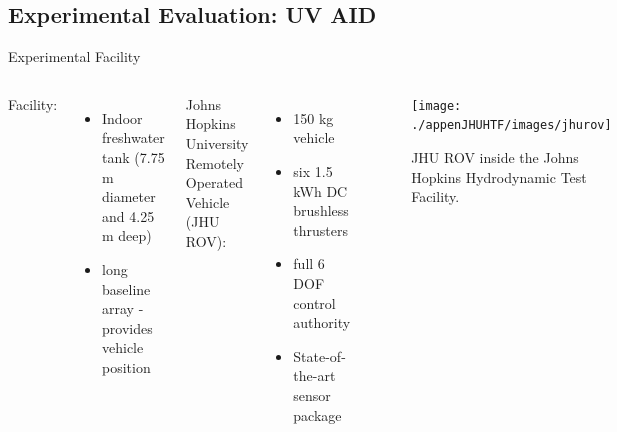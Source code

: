 %


\subsection{Experimental Evaluation: UV AID}

\begin{frame}{Experimental Facility}

  \begin{columns}

    Facility:
    \begin{itemize}
    \item Indoor freshwater tank (7.75 m diameter and 4.25 m deep)
    \item long baseline array - provides vehicle position
    \end{itemize}
    Johns Hopkins University Remotely Operated Vehicle (JHU ROV): 
    \begin{itemize}
    \item 150 kg vehicle 
    \item six 1.5 kWh DC brushless thrusters
    \item full 6 DOF control authority
    \item State-of-the-art sensor package
    \end{itemize}


    \begin{center}
      \begin{figure}[htbp]  
        \begin{center}
          \texttt{[image: ./appenJHUHTF/images/jhurov]}
        \end{center}
        \caption{JHU ROV inside the Johns Hopkins Hydrodynamic Test
          Facility.}
      \end{figure}
    \end{center}    
  \end{columns} 
\end{frame}






